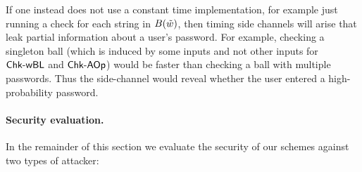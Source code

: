 If one instead does not use a constant time
implementation, for example just running a check for each string in
$B(\tilde{w})$, then timing
side channels will arise that leak partial information about a user's password.
For example, checking a singleton ball (which is induced by some inputs and
not other inputs for $\textnormal{\textsf{Chk-wBL}}$ and $\textnormal{\textsf{Chk-AOp}}$) would be faster 
than checking a ball with multiple passwords. Thus the
side-channel would reveal whether the user entered a high-probability password.


\paragraph{Security evaluation.} In the remainder of this section we evaluate the
security of our schemes against two types of attacker:

